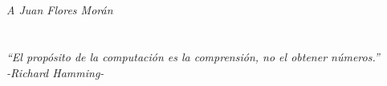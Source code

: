 


\chapter*{}
\thispagestyle{empty}
\begin{flushright}
\textit{A Juan Flores Morán}
\end{flushright}
\thispagestyle{empty}


\newpage
\mbox{}
\thispagestyle{empty}


\chapter*{}
\begin{flushright}
\textit{``El propósito de la computación es la comprensión, no el obtener números.''\\
-Richard Hamming-}
\end{flushright}
\thispagestyle{empty}


\newpage
\mbox{}
\thispagestyle{empty}